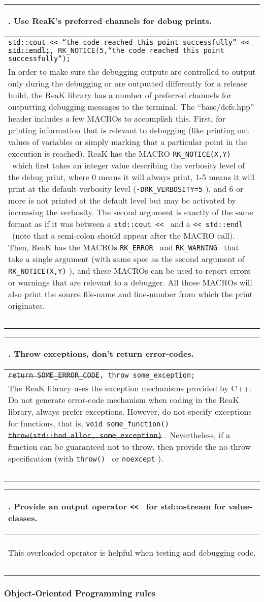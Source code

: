 \documentclass[10pt]{article}
\newcommand{\code}[1]{\color[rgb]{0.2,0.8,0.2}\texttt{#1}\color[rgb]{0,0,0} }
\newcounter {iCommandment}
\newcommand{\CorG}[5]
{
\begin{table}[H]
\begin{center}
\begin{tabular}{| p{12cm} |}
\hline
#1. #2 \\
\hline
\vspace{-0.1cm}
\parbox{12cm}{\code{#3}} \\
\vspace{-0.2cm}
#4 \\
#5 \\
\hline
\end{tabular}
\end{center}
\end{table}
}
\newcommand{\Commandment}[4]
{
\CorG{\textbf{\arabic{iCommandment}}\addtocounter{iCommandment}{1}}
{\textbf{#1}}{#2}{#3}{#4}
}
\begin{document}
\Commandment
{Use ReaK's preferred channels for debug prints.}
{\sout{std::cout << ``the code reached this point successfully'' << std::endl;},
 RK\_NOTICE(5,``the code reached this point successfully'');}
{In order to make sure the debugging outputs are controlled to output only during the debugging or are 
outputted differently for a release build, the ReaK library has a number of preferred channels for outputting
debugging messages to the terminal. The ``base/defs.hpp'' header includes a few MACROs to accomplish this. First,
for printing information that is relevant to debugging (like printing out values of variables or simply marking 
that a particular point in the execution is reached), ReaK has the MACRO \code{RK\_NOTICE(X,Y)}\ which first takes an 
integer value describing the verbosity level of the debug print, where 0 means it will always print, 1-5 means it 
will print at the default verbosity level (\code{-DRK\_VERBOSITY=5}), and 6 or more is not printed at the default level but may be activated 
by increasing the verbosity. The second argument is exactly of the same format as if it was between a \code{std::cout <<}\ and a
\code{<< std::endl}\ (note that a semi-colon should appear after the MACRO call). Then, ReaK has the MACROs 
\code{RK\_ERROR}\ and \code{RK\_WARNING}\ that take a single argument (with same spec as the second argument 
of \code{RK\_NOTICE(X,Y)}), and these MACROs can be used to report errors or warnings that are relevant to a debugger.
All those MACROs will also print the source file-name and line-number from which the print originates.}
{\ }

\Commandment
{Throw exceptions, don't return error-codes.}
{\sout{return SOME\_ERROR\_CODE}, throw some\_exception; }
{The ReaK library uses the exception mechanisms provided by C++. Do not generate error-code mechanism when 
coding in the ReaK library, always prefer exceptions. However, do not specify exceptions for functions, that is,
\code{void some\_function() \sout{throw(std::bad\_alloc, some\_exception)}}. Nevertheless, if a function can be 
guaranteed not to throw, then provide the no-throw specification (with \code{throw()}\ or \code{noexcept}).}
{\ }

\Commandment
{Provide an output operator \code{<<}\ for std::ostream for value-classes.}
{\ }
{This overloaded operator is helpful when testing and debugging code.}
{\ }


\subsubsection{Object-Oriented Programming rules}
\end{document}
